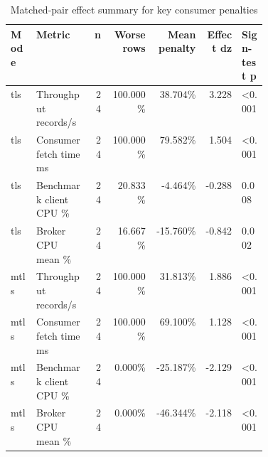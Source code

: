 \begin{table}[H]
\centering
\setlength{\tabcolsep}{4pt}
\renewcommand{\arraystretch}{1.15}
\begin{tabular}{|p{0.10\linewidth}|p{0.22\linewidth}|r|r|r|r|p{0.10\linewidth}|}
\hline
\textbf{Mode} & \textbf{Metric} & \textbf{n} & \textbf{Worse rows} & \textbf{Mean penalty} & \textbf{Effect dz} & \textbf{Sign-test p} \\
\hline
tls & Throughput records/s & 24 & 100.000\% & 38.704\% & 3.228 & <0.001 \\
tls & Consumer fetch time ms & 24 & 100.000\% & 79.582\% & 1.504 & <0.001 \\
tls & Benchmark client CPU \% & 24 & 20.833\% & -4.464\% & -0.288 & 0.008 \\
tls & Broker CPU mean \% & 24 & 16.667\% & -15.760\% & -0.842 & 0.002 \\
mtls & Throughput records/s & 24 & 100.000\% & 31.813\% & 1.886 & <0.001 \\
mtls & Consumer fetch time ms & 24 & 100.000\% & 69.100\% & 1.128 & <0.001 \\
mtls & Benchmark client CPU \% & 24 & 0.000\% & -25.187\% & -2.129 & <0.001 \\
mtls & Broker CPU mean \% & 24 & 0.000\% & -46.344\% & -2.118 & <0.001 \\
\hline
\end{tabular}
\caption{Matched-pair effect summary for key consumer penalties}
\label{tab:consumer-paired-effects}
\end{table}
